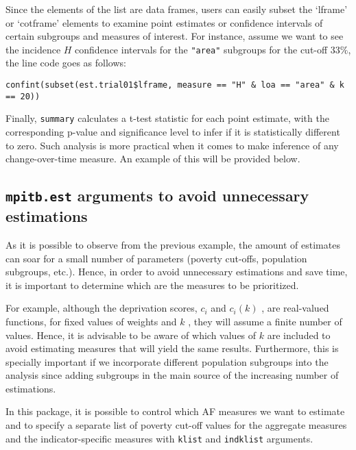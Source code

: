 Since the elements of the list are data frames, users can easily subset
the `lframe' or `cotframe' elements to examine point estimates or
confidence intervals of certain subgroups and measures of interest. For
instance, assume we want to see the incidence \(H\) confidence intervals
for the \texttt{"area"} subgroups for the cut-off \(33\%\), the line code goes as
follows:

\begin{verbatim}
confint(subset(est.trial01$lframe, measure == "H" & loa == "area" & k == 20))
\end{verbatim}

Finally, \texttt{summary} calculates a t-test statistic for each point
estimate, with the corresponding p-value and significance level to infer
if it is statistically different to zero. Such analysis is more
practical when it comes to make inference of any change-over-time measure. An
example of this will be provided below.

\hypertarget{mpitb.est-arguments-to-avoid-unnecessary-estimations}{%
\subsection{\texorpdfstring{\texttt{mpitb.est} arguments to avoid unnecessary estimations}{mpitb.est arguments to avoid unnecessary estimations}}\label{mpitb.est-arguments-to-avoid-unnecessary-estimations}}

As it is possible to observe from the previous example, the amount of
estimates can soar for a small number of parameters (poverty cut-offs,
population subgroups, etc.). Hence, in order to avoid unnecessary
estimations and save time, it is important to determine which are the
measures to be prioritized.

For example, although the deprivation scores, \(c_i\) and \(c_i(k)\) , are
real-valued functions, for fixed values of weights and \(k\) , they will
assume a finite number of values. Hence, it is advisable to be aware of
which values of \(k\) are included to avoid estimating measures that will
yield the same results. Furthermore, this is specially important if we
incorporate different population subgroups into the analysis since adding subgroups in the main source of the increasing number of estimations.

In this package, it is possible to control which AF measures we want to
estimate and to specify a separate list of poverty cut-off values for
the aggregate measures and the indicator-specific measures with \texttt{klist}
and \texttt{indklist} arguments.

